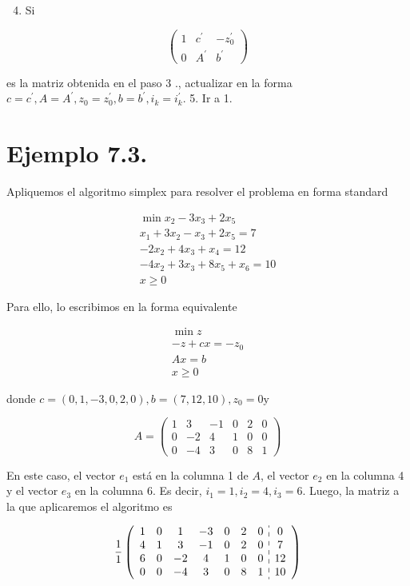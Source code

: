 \documentclass[10pt]{article}
\begin{document}
\begin{enumerate}
  \setcounter{enumi}{3}
  \item Si
\end{enumerate}

$$
\left(\begin{array}{cc|c}
1 & c^{\prime} & -z_{0}^{\prime} \\
0 & A^{\prime} & b^{\prime}
\end{array}\right)
$$

es la matriz obtenida en el paso 3 ., actualizar en la forma $c=c^{\prime}, A=A^{\prime}, z_{0}=z_{0}^{\prime}, b=b^{\prime}, i_{k}=i_{k}^{\prime}$. 5. Ir a 1.

\section*{Ejemplo 7.3.}
Apliquemos el algoritmo simplex para resolver el problema en forma standard

$$
\begin{gathered}
\min x_{2}-3 x_{3}+2 x_{5} \\
x_{1}+3 x_{2}-x_{3}+2 x_{5}=7 \\
-2 x_{2}+4 x_{3}+x_{4}=12 \\
-4 x_{2}+3 x_{3}+8 x_{5}+x_{6}=10 \\
x \geq 0
\end{gathered}
$$

Para ello, lo escribimos en la forma equivalente

$$
\begin{gathered}
\min z \\
-z+c x=-z_{0} \\
A x=b \\
x \geq 0
\end{gathered}
$$

donde $c=(0,1,-3,0,2,0), b=(7,12,10), z_{0}=0 \mathrm{y}$

$$
A=\left(\begin{array}{cccccc}
1 & 3 & -1 & 0 & 2 & 0 \\
0 & -2 & 4 & 1 & 0 & 0 \\
0 & -4 & 3 & 0 & 8 & 1
\end{array}\right)
$$

En este caso, el vector $e_{1}$ está en la columna 1 de $A$, el vector $e_{2}$ en la columna 4 y el vector $e_{3}$ en la columna 6. Es decir, $i_{1}=1, i_{2}=4, i_{3}=6$. Luego, la matriz a la que aplicaremos el algoritmo es

$$
\frac{1}{1}\left(\begin{array}{ccccccc:c}
1 & 0 & 1 & -3 & 0 & 2 & 0 & 0 \\
4 & 1 & 3 & -1 & 0 & 2 & 0 & 7 \\
6 & 0 & -2 & 4 & 1 & 0 & 0 & 12 \\
0 & 0 & -4 & 3 & 0 & 8 & 1 & 10
\end{array}\right)
$$
\end{document}
